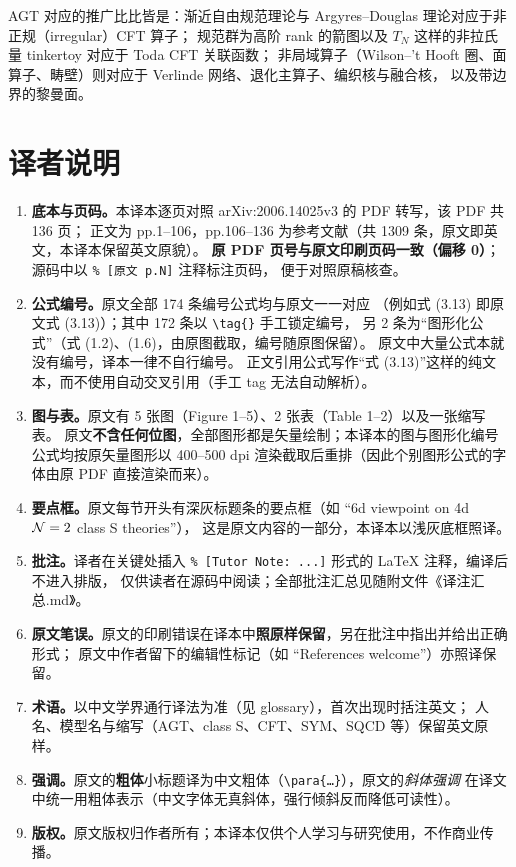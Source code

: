 AGT 对应的推广比比皆是：渐近自由规范理论与 Argyres--Douglas 理论对应于非正规（irregular）CFT 算子；
规范群为高阶 rank 的箭图以及 $T_N$ 这样的非拉氏量 tinkertoy 对应于 Toda CFT 关联函数；
非局域算子（Wilson--'t Hooft 圈、面算子、畴壁）则对应于 Verlinde 网络、退化主算子、编织核与融合核，
以及带边界的黎曼面。

\clearpage

\section*{译者说明}

\begin{enumerate}[leftmargin=2em,itemsep=4pt]
\item \textbf{底本与页码。}本译本逐页对照 arXiv:2006.14025v3 的 PDF 转写，该 PDF 共 136 页；
      正文为 pp.1--106，pp.106--136 为参考文献（共 1309 条，原文即英文，本译本保留英文原貌）。
      \textbf{原 PDF 页号与原文印刷页码一致（偏移 0）}；源码中以 \verb|% [原文 p.N]| 注释标注页码，
      便于对照原稿核查。
\item \textbf{公式编号。}原文全部 174 条编号公式均与原文一一对应
      （例如式 (3.13) 即原文式 (3.13)）；其中 172 条以 \verb|\tag{}| 手工锁定编号，
      另 2 条为“图形化公式”（式 (1.2)、(1.6)，由原图截取，编号随原图保留）。
      原文中大量公式本就没有编号，译本一律不自行编号。
      正文引用公式写作“式 (3.13)”这样的纯文本，而不使用自动交叉引用（手工 tag 无法自动解析）。
\item \textbf{图与表。}原文有 5 张图（Figure 1--5）、2 张表（Table 1--2）以及一张缩写表。
      原文\textbf{不含任何位图}，全部图形都是矢量绘制；本译本的图与图形化编号公式均按原矢量图形以 400--500 dpi
      渲染截取后重排（因此个别图形公式的字体由原 PDF 直接渲染而来）。
\item \textbf{要点框。}原文每节开头有深灰标题条的要点框（如 “6d viewpoint on 4d $\mathcal{N}=2$ class S theories”），
      这是原文内容的一部分，本译本以浅灰底框照译。
\item \textbf{批注。}译者在关键处插入 \verb|% [Tutor Note: ...]| 形式的 LaTeX 注释，编译后不进入排版，
      仅供读者在源码中阅读；全部批注汇总见随附文件《译注汇总.md》。
\item \textbf{原文笔误。}原文的印刷错误在译本中\textbf{照原样保留}，另在批注中指出并给出正确形式；
      原文中作者留下的编辑性标记（如 “References welcome”）亦照译保留。
\item \textbf{术语。}以中文学界通行译法为准（见 glossary），首次出现时括注英文；
      人名、模型名与缩写（AGT、class S、CFT、SYM、SQCD 等）保留英文原样。
\item \textbf{强调。}原文的\textbf{粗体}小标题译为中文粗体（\verb|\para{…}|），原文的\emph{斜体强调}
      在译文中统一用粗体表示（中文字体无真斜体，强行倾斜反而降低可读性）。
\item \textbf{版权。}原文版权归作者所有；本译本仅供个人学习与研究使用，不作商业传播。
\end{enumerate}

\vspace{0.6em}

\clearpage
\tableofcontents
\clearpage

